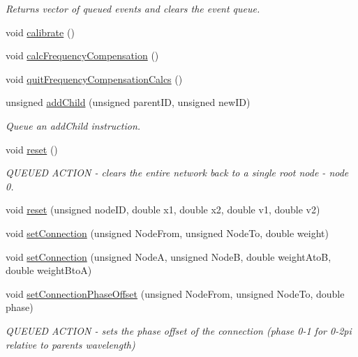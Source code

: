 \begin{DoxyCompactItemize}
\begin{DoxyCompactList}\small\item\em Returns vector of queued events and clears the event queue. \end{DoxyCompactList}\item 
void \mbox{\hyperlink{classMatsuokaEngine_a68d6295dfa0d28e3bc9d743e763d6ee9}{calibrate}} ()
\item 
void \mbox{\hyperlink{classMatsuokaEngine_a7b665074cd1e6fddc875c7d36b305f66}{calc\+Frequency\+Compensation}} ()
\item 
void \mbox{\hyperlink{classMatsuokaEngine_a7937f29c227ad663eb153b01b11d307f}{quit\+Frequency\+Compensation\+Calcs}} ()
\item 
unsigned \mbox{\hyperlink{classMatsuokaEngine_a2e441b2259ae96759bf300c1f2af4ab1}{add\+Child}} (unsigned parent\+ID, unsigned new\+ID)
\begin{DoxyCompactList}\small\item\em Queue an add\+Child instruction. \end{DoxyCompactList}\item 
void \mbox{\hyperlink{classMatsuokaEngine_a627983362b1b84ee5d3c72d7540d9a47}{reset}} ()
\begin{DoxyCompactList}\small\item\em Q\+U\+E\+U\+ED A\+C\+T\+I\+ON -\/ clears the entire network back to a single root node -\/ node 0. \end{DoxyCompactList}\item 
void \mbox{\hyperlink{classMatsuokaEngine_aa2a425173fed2f3f30c1fa5c6e680764}{reset}} (unsigned node\+ID, double x1, double x2, double v1, double v2)
\item 
void \mbox{\hyperlink{classMatsuokaEngine_a716d4e8f1dc446179c5424007995ab59}{set\+Connection}} (unsigned Node\+From, unsigned Node\+To, double weight)
\item 
void \mbox{\hyperlink{classMatsuokaEngine_a1335ac9672e6443135d78a8192b5aad5}{set\+Connection}} (unsigned NodeA, unsigned NodeB, double weight\+AtoB, double weight\+BtoA)
\item 
void \mbox{\hyperlink{classMatsuokaEngine_a22045d1c6d6c8bcf2b282c9c98e46f13}{set\+Connection\+Phase\+Offset}} (unsigned Node\+From, unsigned Node\+To, double phase)
\begin{DoxyCompactList}\small\item\em Q\+U\+E\+U\+ED A\+C\+T\+I\+ON -\/ sets the phase offset of the connection (phase 0-\/1 for 0-\/2pi relative to parent\textquotesingle{}s wavelength) \end{DoxyCompactList}\item 

\end{DoxyCompactItemize}
